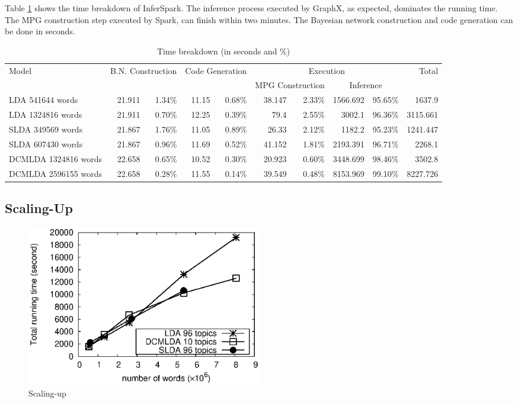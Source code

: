 Table \ref{breakdown} shows the time breakdown of InferSpark.
The inference process executed by GraphX, as expected, dominates the running time.
The MPG construction step executed by Spark, can finish within two minutes.
The Bayesian network construction and code generation can be done in seconds.


\begin{table}
\centering
\caption{Time breakdown (in seconds and \%)}
\label{breakdown}
\scriptsize
\begin{tabular}{|l||*{8}{r|}r|}
\hline
Model & \multicolumn{2}{c|}{B.N. Construction} & \multicolumn{2}{c|}{Code Generation}	& \multicolumn{4}{c|}{Execution} & Total \\\cline{6-9} 
  & \multicolumn{2}{c|}{ } & \multicolumn{2}{c|}{ }	& \multicolumn{2}{c|}{MPG Construction} & \multicolumn{2}{c|}{Inference} &	 \\ \hline \hline
LDA 541644 words	& 21.911	& 1.34\%	& 11.15 &	0.68\%	& 38.147	& 2.33\% &	1566.692 & 95.65\%	& 1637.9 \\ \hline
LDA 1324816 words &	21.911 & 0.70\% & 12.25	& 0.39\% & 79.4 & 2.55\%	& 3002.1 & 96.36\% &	3115.661 \\ \hline
SLDA 349569 words &	21.867 & 1.76\% & 11.05 &	0.89\%	& 26.33 & 2.12\% &	1182.2	& 95.23\%	& 1241.447 \\ \hline
SLDA 607430 words & 21.867 & 0.96\%	& 11.69	& 0.52\% & 41.152	& 1.81\%	& 2193.391	& 96.71\%	& 2268.1 \\ \hline
DCMLDA 1324816 words & 22.658 & 0.65\%	& 10.52 & 0.30\% &	20.923	& 0.60\% & 3448.699	& 98.46\% &	3502.8 \\ \hline
DCMLDA 2596155 words & 22.658 & 0.28\% & 11.55 & 0.14\%	& 39.549 & 0.48\%	& 8153.969 & 99.10\%	& 8227.726 \\ \hline

\end{tabular}
\end{table} 


\subsection{Scaling-Up}

\begin{figure}[h]\centering
	\includegraphics[width=0.5\textwidth]{figs/exp_lda_datasize.eps}
	\caption{Scaling-up}
	\label{fig:scale-up}
\end{figure}


